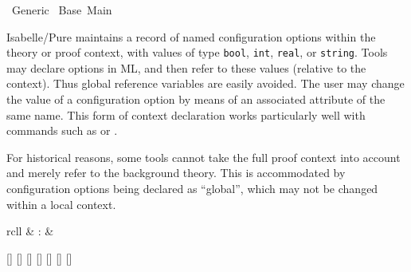 %
\begin{isabellebody}%
\def\isabellecontext{Generic}%
%
\isadelimtheory
%
\endisadelimtheory
%
\isatagtheory
{}\isamarkupfalse%
\ Generic\isanewline
{}\ Base\ Main\isanewline
{}%
\endisatagtheory
{\isafoldtheory}%
%
\isadelimtheory
%
\endisadelimtheory
%
\isamarkuptrue%
%
\isamarkuptrue%
%
\begin{isamarkuptext}%
Isabelle/Pure maintains a record of named configuration
  options within the theory or proof context, with values of type
  \verb|bool|, \verb|int|, \verb|real|, or \verb|string|.  Tools may declare options in ML, and then refer to these
  values (relative to the context).  Thus global reference variables
  are easily avoided.  The user may change the value of a
  configuration option by means of an associated attribute of the same
  name.  This form of context declaration works particularly well with
  commands such as \hyperlink{command.declare}{\mbox{}} or \hyperlink{command.using}{\mbox{}}.

  For historical reasons, some tools cannot take the full proof
  context into account and merely refer to the background theory.
  This is accommodated by configuration options being declared as
  ``global'', which may not be changed within a local context.

  \begin{matharray}{rcll}
    \hypertarget{command.print-configs}{\hyperlink{command.print-configs}{\mbox{}}} & : &  \\
  \end{matharray}

  \begin{railoutput}
[]
\rail@bar
{}
[]
\rail@bar
{}[]
[]
[]
[]
[]
\rail@endbar
\rail@endbar
\rail@end
\end{railoutput}



\end{isamarkuptext}
\end{isabellebody}
